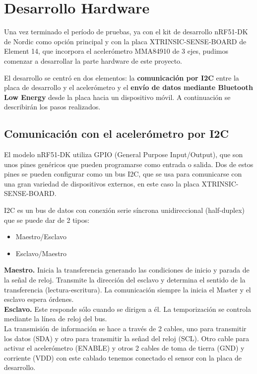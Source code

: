 \cleardoublepage

\chapter{Desarrollo Hardware}
\label{makereference5}

Una vez terminado el período de pruebas, ya con el kit de desarrollo nRF51-DK de Nordic como opción principal y con la placa XTRINSIC-SENSE-BOARD de Element 14, que incorpora el acelerómetro MMA84910 de 3 ejes, pudimos comenzar a desarrollar la parte hardware de este proyecto.

El desarrollo se centró en dos elementos: la \textbf{comunicación por I2C} entre la placa de desarrollo y el acelerómetro y el \textbf{envío de datos mediante Bluetooth Low Energy} desde la placa hacia un dispositivo móvil. A continuación se describirán los pasos realizados.

\section{Comunicación con el acelerómetro por I2C}
\label{makereference5.1}

El modelo nRF51-DK utiliza GPIO (General Purpose Input/Output), que son unos pines genéricos que pueden programarse como entrada o salida. Dos de estos pines se pueden configurar como un bus I2C, que se usa para comunicarse con una gran variedad de dispositivos externos, en este caso la placa XTRINSIC-SENSE-BOARD. 

I2C es un bus de datos con conexión serie síncrona unidireccional (half-duplex) que se puede dar de 2 tipos:
\begin{itemize}
	\item Maestro/Esclavo
	\item Esclavo/Maestro
\end{itemize}

\textbf{Maestro.} Inicia la transferencia generando las condiciones de inicio y parada de la señal de reloj. Transmite la dirección del esclavo y determina el sentido de la transferencia (lectura-escritura). La comunicación siempre la inicia el Master y el esclavo espera órdenes.\\

\textbf{Esclavo.} Este responde sólo cuando se dirigen a él. La temporización se controla mediante la línea de reloj del bus.\\

La transmisión de información se hace a través de 2 cables, uno para transmitir los datos (SDA) y otro para transmitir la señad del reloj (SCL). Otro cable para activar el acelerómetro (ENABLE) y otros 2 cables de toma de tierra (GND) y corriente (VDD) con este cablado tenemos conectado el sensor con la placa de desarrollo.

